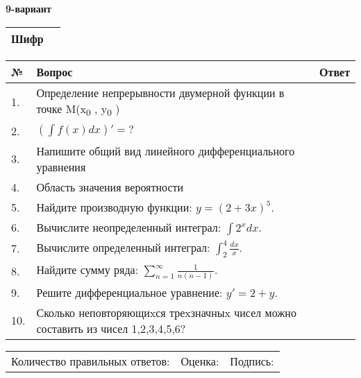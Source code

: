 \documentclass{article}
\begin{document}
  \egroup
  
  \newpage
  
  
  \textbf{9-вариант}\\
  
  \bgroup
  \def\arraystretch{1.6} %
  
  \begin{tabular}{|m{5.7cm}|m{9.5cm}|}
  \hline
  Шифр & \\
  \hline
  \end{tabular}
  
  \vspace{1cm}
  
  \begin{tabular}{|m{0.7cm}|m{10cm}|m{4cm}|}
  \hline
  № & Вопрос & Ответ \\
  \hline
  1. & Определение непрерывности двумерной функции в точке M(x\textsubscript{0} , y\textsubscript{0} ) &  \\
  \hline
  2. & \(\left( \int{f(x)dx} \right)' = ?\) &  \\
  \hline
  3. & Напишите общий вид линейного дифференциального уравнения &  \\
  \hline
  4. & Область значения вероятности &  \\
  \hline
  5. & Найдите производную функции: \(y = (2 + 3x)^{5}\). &  \\
  \hline
  6. & Вычислите неопределенный интеграл: \(\int2^{x}dx\). &  \\
  \hline
  7. & Вычислите определенный интеграл: \(\int_{2}^{4}\frac{dx}{x}\). &  \\
  \hline
  8. & Найдите сумму ряда: \(\sum_{n = 1}^{\infty}\frac{1}{n(n - 1)}\). &  \\
  \hline
  9. & Решите дифференциальное уравнение: \(y' = 2 + y\). &  \\
  \hline
  10. & Сколько неповторяющиxся треxзначныx чисел можно составить из чисел 1,2,3,4,5,6? &  \\
  \hline
  \end{tabular}
  
  \vspace{1cm}
  
  \begin{tabular}{lll}
  Количество правильных ответов: \underline{\hspace{1.5cm}} & 
  Оценка: \underline{\hspace{1.5cm}} & 
  Подпись: \underline{\hspace{2cm}} \\
  \end{tabular}
  
\end{document}
